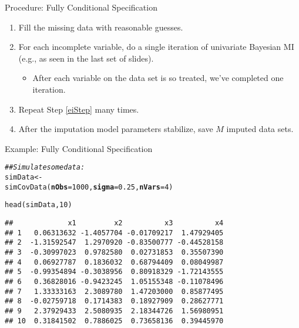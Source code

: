 \documentclass{beamer}\usepackage[]{graphicx}\usepackage[]{color}
\makeatletter
\newcommand{\hlnum}[1]{\textcolor[rgb]{0.69,0.494,0}{#1}}%
\newcommand{\hlcom}[1]{\textcolor[rgb]{0.514,0.506,0.514}{\textit{#1}}}%
\newcommand{\hlstd}[1]{\textcolor[rgb]{0,0,0}{#1}}%
\newcommand{\hlkwb}[1]{\textcolor[rgb]{0,0.341,0.682}{#1}}%
\newcommand{\hlkwc}[1]{\textcolor[rgb]{0,0,0}{\textbf{#1}}}%
\newcommand{\hlkwd}[1]{\textcolor[rgb]{0.004,0.004,0.506}{#1}}%
\newenvironment{kframe}{%
 \def\at@end@of@kframe{}%
 \ifinner\ifhmode%
  \def\at@end@of@kframe{\end{minipage}}%
  \begin{minipage}{\columnwidth}%
 \fi\fi%
 \def\FrameCommand##1{\hskip\@totalleftmargin \hskip-\fboxsep
 \colorbox{shadecolor}{##1}\hskip-\fboxsep
     \hskip-\linewidth \hskip-\@totalleftmargin \hskip\columnwidth}%
 \MakeFramed {\advance\hsize-\width
   \@totalleftmargin\z@ \linewidth\hsize
   \@setminipage}}%
 {\par\unskip\endMakeFramed%
 \at@end@of@kframe}
\newenvironment{knitrout}{}{} %
\makeatother
\begin{document}
\begin{frame}{Procedure: Fully Conditional Specification}
  
  \begin{enumerate}
  \item Fill the missing data with reasonable guesses.
    \vb
  \item For each incomplete variable, do a single iteration of univariate 
    Bayesian MI (e.g., as seen in the last set of slides). \label{eiStep}
    \vb
    \begin{itemize}
    \item After each variable on the data set is so treated, we've completed one 
      iteration.
    \end{itemize}
    \vc
  \item Repeat Step \ref{eiStep} many times.
    \vb
  \item After the imputation model parameters stabilize, save $M$ imputed data 
    sets.
  \end{enumerate}
  
\end{frame}

\watermarkoff %

\begin{frame}[fragile]{Example: Fully Conditional Specification}
  
\begin{knitrout}\footnotesize
{}\color{fgcolor}\begin{kframe}
\begin{alltt}
\hlcom{## Simulate some data:}
\hlstd{simData} \hlkwb{<-}
    \hlkwd{simCovData}\hlstd{(}\hlkwc{nObs} \hlstd{=} \hlnum{1000}\hlstd{,} \hlkwc{sigma} \hlstd{=} \hlnum{0.25}\hlstd{,} \hlkwc{nVars} \hlstd{=} \hlnum{4}\hlstd{)}

\hlkwd{head}\hlstd{(simData,} \hlnum{10}\hlstd{)}
\end{alltt}
\begin{verbatim}
##             x1         x2          x3          x4
## 1   0.06313632 -1.4057704 -0.01709217  1.47929405
## 2  -1.31592547  1.2970920 -0.83500777 -0.44528158
## 3  -0.30997023  0.9782580  0.02731853  0.35507390
## 4   0.06927787  0.1836032  0.68794409  0.08049987
## 5  -0.99354894 -0.3038956  0.80918329 -1.72143555
## 6   0.36828016 -0.9423245  1.05155348 -0.11078496
## 7   1.33333163  2.3089780  1.47203000  0.85877495
## 8  -0.02759718  0.1714383  0.18927909  0.28627771
## 9   2.37929433  2.5080935  2.18344726  1.56980951
## 10  0.31841502  0.7886025  0.73658136  0.39445970
\end{verbatim}
\end{kframe}
\end{knitrout}

\end{frame}
\end{document}

